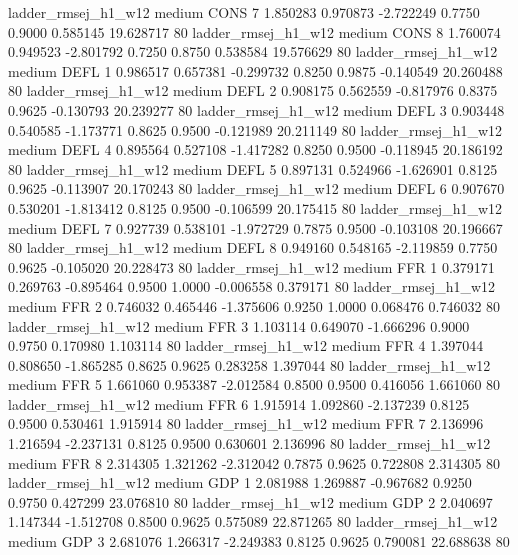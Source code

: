    ladder_rmsej_h1_w12     medium     CONS                 7  1.850283 0.970873 -2.722249 0.7750 0.9000  0.585145   19.628717 80
   ladder_rmsej_h1_w12     medium     CONS                 8  1.760074 0.949523 -2.801792 0.7250 0.8750  0.538584   19.576629 80
   ladder_rmsej_h1_w12     medium     DEFL                 1  0.986517 0.657381 -0.299732 0.8250 0.9875 -0.140549   20.260488 80
   ladder_rmsej_h1_w12     medium     DEFL                 2  0.908175 0.562559 -0.817976 0.8375 0.9625 -0.130793   20.239277 80
   ladder_rmsej_h1_w12     medium     DEFL                 3  0.903448 0.540585 -1.173771 0.8625 0.9500 -0.121989   20.211149 80
   ladder_rmsej_h1_w12     medium     DEFL                 4  0.895564 0.527108 -1.417282 0.8250 0.9500 -0.118945   20.186192 80
   ladder_rmsej_h1_w12     medium     DEFL                 5  0.897131 0.524966 -1.626901 0.8125 0.9625 -0.113907   20.170243 80
   ladder_rmsej_h1_w12     medium     DEFL                 6  0.907670 0.530201 -1.813412 0.8125 0.9500 -0.106599   20.175415 80
   ladder_rmsej_h1_w12     medium     DEFL                 7  0.927739 0.538101 -1.972729 0.7875 0.9500 -0.103108   20.196667 80
   ladder_rmsej_h1_w12     medium     DEFL                 8  0.949160 0.548165 -2.119859 0.7750 0.9625 -0.105020   20.228473 80
   ladder_rmsej_h1_w12     medium      FFR                 1  0.379171 0.269763 -0.895464 0.9500 1.0000 -0.006558    0.379171 80
   ladder_rmsej_h1_w12     medium      FFR                 2  0.746032 0.465446 -1.375606 0.9250 1.0000  0.068476    0.746032 80
   ladder_rmsej_h1_w12     medium      FFR                 3  1.103114 0.649070 -1.666296 0.9000 0.9750  0.170980    1.103114 80
   ladder_rmsej_h1_w12     medium      FFR                 4  1.397044 0.808650 -1.865285 0.8625 0.9625  0.283258    1.397044 80
   ladder_rmsej_h1_w12     medium      FFR                 5  1.661060 0.953387 -2.012584 0.8500 0.9500  0.416056    1.661060 80
   ladder_rmsej_h1_w12     medium      FFR                 6  1.915914 1.092860 -2.137239 0.8125 0.9500  0.530461    1.915914 80
   ladder_rmsej_h1_w12     medium      FFR                 7  2.136996 1.216594 -2.237131 0.8125 0.9500  0.630601    2.136996 80
   ladder_rmsej_h1_w12     medium      FFR                 8  2.314305 1.321262 -2.312042 0.7875 0.9625  0.722808    2.314305 80
   ladder_rmsej_h1_w12     medium      GDP                 1  2.081988 1.269887 -0.967682 0.9250 0.9750  0.427299   23.076810 80
   ladder_rmsej_h1_w12     medium      GDP                 2  2.040697 1.147344 -1.512708 0.8500 0.9625  0.575089   22.871265 80
   ladder_rmsej_h1_w12     medium      GDP                 3  2.681076 1.266317 -2.249383 0.8125 0.9625  0.790081   22.688638 80
